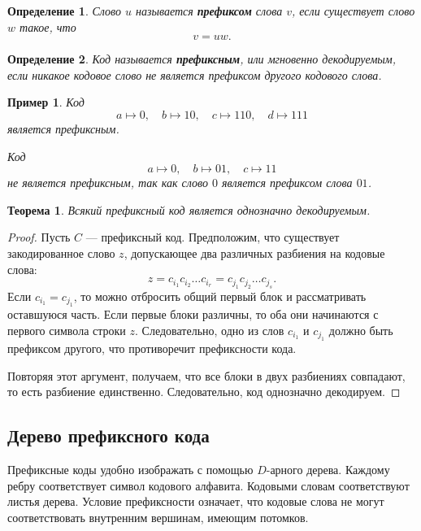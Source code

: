 \documentclass[12pt,a4paper]{article}
\newtheorem{definition}{Определение}[section]
\newtheorem{theorem}{Теорема}[section]
\newtheorem{example}{Пример}[section]
\begin{document}
\begin{definition}
Слово $u$ называется \textbf{префиксом} слова $v$, если существует слово $w$ такое, что
\[
    v=uw.
\]
\end{definition}

\begin{definition}
Код называется \textbf{префиксным}, или мгновенно декодируемым, если никакое кодовое слово не является префиксом другого кодового слова.
\end{definition}

\begin{example}
Код
\[
    a\mapsto 0,\quad b\mapsto 10,\quad c\mapsto 110,\quad d\mapsto 111
\]
является префиксным.

Код
\[
    a\mapsto 0,\quad b\mapsto 01,\quad c\mapsto 11
\]
не является префиксным, так как слово $0$ является префиксом слова $01$.
\end{example}

\begin{theorem}
Всякий префиксный код является однозначно декодируемым.
\end{theorem}

\begin{proof}
Пусть $C$ --- префиксный код. Предположим, что существует закодированное слово $z$, допускающее два различных разбиения на кодовые слова:
\[
    z=c_{i_1}c_{i_2}\dots c_{i_r}
     =c_{j_1}c_{j_2}\dots c_{j_s}.
\]
Если $c_{i_1}=c_{j_1}$, то можно отбросить общий первый блок и рассматривать оставшуюся часть.
Если первые блоки различны, то оба они начинаются с первого символа строки $z$.
Следовательно, одно из слов $c_{i_1}$ и $c_{j_1}$ должно быть префиксом другого, что противоречит префиксности кода.

Повторяя этот аргумент, получаем, что все блоки в двух разбиениях совпадают, то есть разбиение единственно.
Следовательно, код однозначно декодируем.
\end{proof}

\subsection{Дерево префиксного кода}

Префиксные коды удобно изображать с помощью $D$-арного дерева.
Каждому ребру соответствует символ кодового алфавита.
Кодовыми словам соответствуют листья дерева.
Условие префиксности означает, что кодовые слова не могут соответствовать внутренним вершинам, имеющим потомков.
\end{document}
